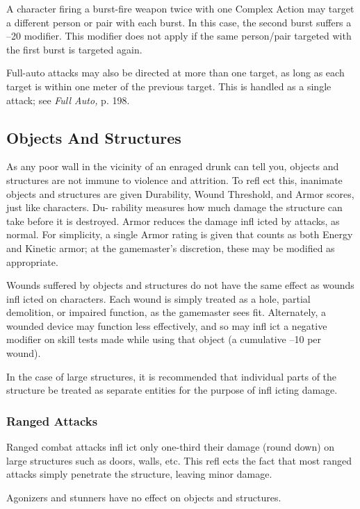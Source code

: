 A character firing a burst-fire weapon twice with 
one Complex Action may target a different person or 
pair with each burst. In this case, the second burst 
suffers a –20 modifier. This modifier does not apply 
if the same person/pair targeted with the first burst is 
targeted again.

Full-auto attacks may also be directed at more than 
one target, as long as each target is within one meter 
of the previous target. This is handled as a single 
attack; see \textit{Full Auto,} p. 198.

\subsection{Objects And Structures}

As any poor wall in the vicinity of an enraged drunk 
can tell you, objects and structures are not immune 
to violence and attrition. To refl ect this, inanimate 
objects and structures are given Durability, Wound 
Threshold, and Armor scores, just like characters. Du-
rability measures how much damage the structure can 
take before it is destroyed. Armor reduces the damage 
infl icted by attacks, as normal. For simplicity, a single 
Armor rating is given that counts as both Energy and 
Kinetic armor; at the gamemaster's discretion, these 
may be modified as appropriate.

Wounds suffered by objects and structures do not have 
the same effect as wounds infl icted on characters. Each 
wound is simply treated as a hole, partial demolition, or 
impaired function, as the gamemaster sees fit. Alternately, 
a wounded device may function less effectively, and so 
may infl ict a negative modifier on skill tests made while 
using that object (a cumulative –10 per wound).

In the case of large structures, it is recommended 
that individual parts of the structure be treated as 
separate entities for the purpose of infl icting damage.

\subsubsection{Ranged Attacks}

Ranged combat attacks infl ict only one-third their 
damage (round down) on large structures such 
as doors, walls, etc. This refl ects the fact that most 
ranged attacks simply penetrate the structure, leaving 
minor damage.

Agonizers and stunners have no effect on objects 
and structures.

